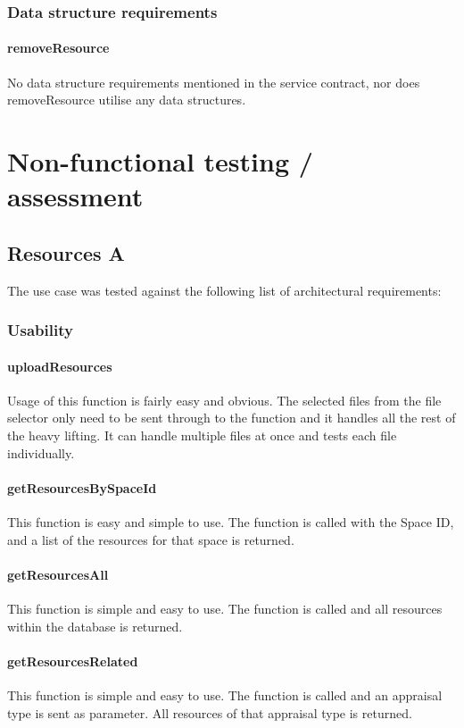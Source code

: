\documentclass[a4paper]{article}
\begin{document}
\subsubsection {Data structure requirements}

\paragraph{removeResource}
No data structure requirements mentioned in the service contract, nor does removeResource utilise any data structures.

\section {Non-functional testing / assessment}
\subsection {Resources A}
The use case was tested against the following list of architectural requirements:
\subsubsection {Usability}

\paragraph{uploadResources}
Usage of this function is fairly easy and obvious. The selected files from the file selector only need to be sent through to the function and it handles all the rest of the heavy lifting. It can handle multiple files at once and tests each file individually.

\paragraph{getResourcesBySpaceId}
This function is easy and simple to use. The function is called with the Space ID, and a list of the resources for that space is returned.

\paragraph{getResourcesAll}
This function is simple and easy to use. The function is called and all resources within the database is returned.

\paragraph{getResourcesRelated}
This function is simple and easy to use. The function is called and an appraisal type is sent as parameter. All resources of that appraisal type is returned.
\end{document}
